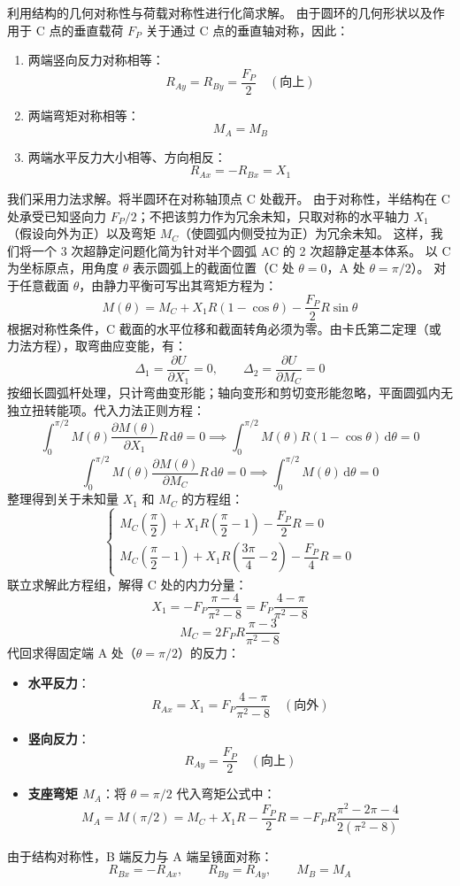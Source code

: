 \documentclass[UTF8,fontset=windows]{ctexart}
\newcommand{\diff}{\,\mathrm{d}}
\begin{document}
利用结构的几何对称性与荷载对称性进行化简求解。
由于圆环的几何形状以及作用于 C 点的垂直载荷 $F_P$ 关于通过 C 点的垂直轴对称，因此：
\begin{enumerate}
    \item 两端竖向反力对称相等：
          \[
              R_{Ay} = R_{By} = \frac{F_P}{2} \quad (\text{向上})
          \]
    \item 两端弯矩对称相等：
          \[
              M_A = M_B
          \]
    \item 两端水平反力大小相等、方向相反：
          \[
              R_{Ax} = -R_{Bx} = X_1
          \]
\end{enumerate}
我们采用力法求解。将半圆环在对称轴顶点 C 处截开。
由于对称性，半结构在 C 处承受已知竖向力 $F_P/2$；不把该剪力作为冗余未知，只取对称的水平轴力 $X_1$（假设向外为正）以及弯矩 $M_C$（使圆弧内侧受拉为正）为冗余未知。
这样，我们将一个 3 次超静定问题化简为针对半个圆弧 AC 的 2 次超静定基本体系。
以 C 为坐标原点，用角度 $\theta$ 表示圆弧上的截面位置（C 处 $\theta = 0$，A 处 $\theta = \pi/2$）。
对于任意截面 $\theta$，由静力平衡可写出其弯矩方程为：
\[
    M(\theta) = M_C + X_1 R (1 - \cos\theta) - \frac{F_P}{2} R \sin\theta
\]
根据对称性条件，C 截面的水平位移和截面转角必须为零。由卡氏第二定理（或力法方程），取弯曲应变能，有：
\[
    \Delta_1 = \frac{\partial U}{\partial X_1} = 0, \qquad \Delta_2 = \frac{\partial U}{\partial M_C} = 0
\]
按细长圆弧杆处理，只计弯曲变形能；轴向变形和剪切变形能忽略，平面圆弧内无独立扭转能项。代入力法正则方程：
\[
    \int_{0}^{\pi/2} M(\theta) \frac{\partial M(\theta)}{\partial X_1} R \diff \theta = 0 \implies \int_{0}^{\pi/2} M(\theta) R(1-\cos\theta) \diff \theta = 0
\]
\[
    \int_{0}^{\pi/2} M(\theta) \frac{\partial M(\theta)}{\partial M_C} R \diff \theta = 0 \implies \int_{0}^{\pi/2} M(\theta) \diff \theta = 0
\]
整理得到关于未知量 $X_1$ 和 $M_C$ 的方程组：
\[
    \begin{cases}
        M_C \left(\dfrac{\pi}{2}\right) + X_1 R \left(\dfrac{\pi}{2} - 1\right) - \dfrac{F_P}{2} R = 0 \\
        M_C \left(\dfrac{\pi}{2} - 1\right) + X_1 R \left(\dfrac{3\pi}{4} - 2\right) - \dfrac{F_P}{4} R = 0
    \end{cases}
\]
联立求解此方程组，解得 C 处的内力分量：
\[
    X_1 = -F_P \frac{\pi - 4}{\pi^2 - 8} = F_P \frac{4 - \pi}{\pi^2 - 8}
\]
\[
    M_C = 2 F_P R \frac{\pi - 3}{\pi^2 - 8}
\]
代回求得固定端 A 处（$\theta = \pi/2$）的反力：
\begin{itemize}
    \item \textbf{水平反力}：
          \[
              R_{Ax} = X_1 = F_P \frac{4 - \pi}{\pi^2 - 8} \quad (\text{向外})
          \]
    \item \textbf{竖向反力}：
          \[
              R_{Ay} = \frac{F_P}{2} \quad (\text{向上})
          \]
    \item \textbf{支座弯矩 $M_A$}：将 $\theta = \pi/2$ 代入弯矩公式中：
          \[
              M_A = M(\pi/2) = M_C + X_1 R - \frac{F_P}{2} R = -F_P R \frac{\pi^2 - 2\pi - 4}{2(\pi^2 - 8)}
          \]
\end{itemize}
由于结构对称性，B 端反力与 A 端呈镜面对称：
\[
    R_{Bx} = - R_{Ax}, \qquad R_{By} = R_{Ay}, \qquad M_B = M_A
\]
\end{document}
